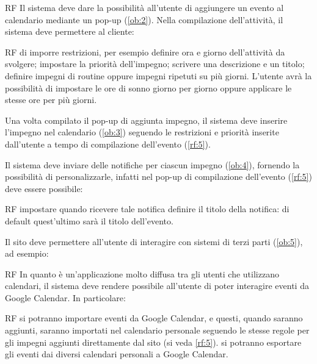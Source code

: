 \begin {listaPersonale}{RF}
Il sistema deve dare la possibilità all'utente di aggiungere un evento al calendario mediante un pop-up (\ref{ob:2}). 
Nella compilazione dell’attività, il sistema deve permettere al cliente: 
\begin{listaPersonale2}{RF}
	 di imporre restrizioni, per esempio definire ora e giorno dell’attività da svolgere; 
	 impostare la priorità dell'impegno;
	 scrivere una descrizione e un titolo;
	 definire impegni di routine oppure impegni ripetuti su 
	più giorni. 
 L’utente avrà la possibilità di impostare le ore di sonno giorno per giorno oppure applicare le stesse ore per più giorni.
\end{listaPersonale2}


Una volta compilato il pop-up di aggiunta impegno, il sistema deve inserire l'impegno nel calendario (\ref{ob:3}) seguendo le restrizioni e priorità inserite dall'utente a tempo di compilazione dell'evento (\ref{rf:5}).

Il sistema deve inviare delle notifiche per ciascun impegno (\ref{ob:4}), fornendo la possibilità di 
personalizzarle, infatti nel pop-up di compilazione dell'evento (\ref{rf:5}) deve essere possibile: 
\begin{listaPersonale2}{RF}
	 impostare quando ricevere tale notifica
	 definire il titolo della notifica: di default quest'ultimo sarà il titolo dell’evento.
\end{listaPersonale2}

Il sito deve permettere all’utente di interagire con sistemi di terzi parti (\ref{ob:5}), ad esempio:

\begin{listaPersonale2}{RF}
In quanto è un'applicazione molto diffusa tra gli utenti che utilizzano calendari,
il sistema deve rendere possibile all'utente di poter interagire eventi da Google Calendar. 
In particolare: 
\begin{listaPersonale3}{RF}
	 si potranno importare eventi da Google Calendar, e questi, quando saranno aggiunti, saranno importati nel calendario personale seguendo le stesse regole per gli impegni aggiunti direttamente dal sito (si veda \ref{rf:5}).
	 si potranno esportare gli eventi dai diversi calendari personali a Google Calendar.
\end{listaPersonale3}


\end{listaPersonale2}
\end{listaPersonale}
